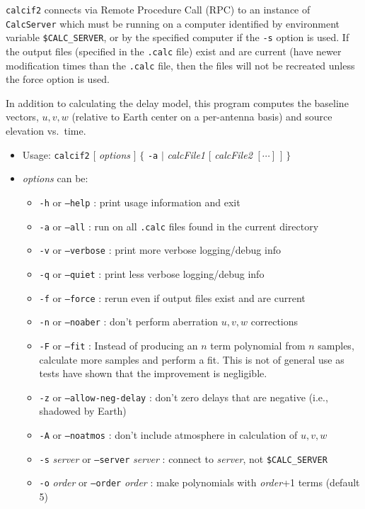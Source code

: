 {\tt calcif2} connects via Remote Procedure Call (RPC) to an instance of {\tt CalcServer} which must be running on a computer identified by environment variable {\tt \$CALC\_SERVER}, or by the specified computer if the {\tt -s} option is used.
If the output files (specified in the {\tt .calc} file) exist and are current (have newer modification times than the {\tt .calc} file, then the files will not be recreated unless the force option is used.

In addition to calculating the delay model, this program computes the baseline vectors, $u,v,w$ (relative to Earth center on a per-antenna basis) and source elevation vs.\ time.

\begin{itemize}
\item[] Usage: {\tt calcif2} $[$ {\em options} $]$ $\{$ {\tt -a} $\mid$ {\em calcFile1} $[$ {\em calcFile2} $[\cdots]$ $]$ $\}$
\item[] {\em options} can be:
\begin{itemize}
\item[] {\tt -h} or {\tt --help} : print usage information and exit
\item[] {\tt -a} or {\tt --all} : run on all {\tt .calc} files found in the current directory
\item[] {\tt -v} or {\tt --verbose} : print more verbose logging/debug info
\item[] {\tt -q} or {\tt --quiet} : print less verbose logging/debug info
\item[] {\tt -f} or {\tt --force} : rerun even if output files exist and are current
\item[] {\tt -n} or {\tt --noaber} : don't perform aberration $u,v,w$ corrections
\item[] {\tt -F} or {\tt --fit} : Instead of producing an $n$ term polynomial from $n$ samples, calculate more samples and perform a fit.  This is not of general use as tests have shown that the improvement is negligible.
\item[] {\tt -z} or {\tt --allow-neg-delay} : don't zero delays that are negative (i.e., shadowed by Earth)
\item[] {\tt -A} or {\tt --noatmos} : don't include atmosphere in calculation of $u,v,w$
\item[] {\tt -s} {\em server} or {\tt --server} {\em server} : connect to {\em server}, not {\tt \$CALC\_SERVER}
\item[] {\tt -o} {\em order} or {\tt --order} {\em order} : make polynomials with {\em order}+1 terms (default 5)  

\end{itemize}
\end{itemize}
